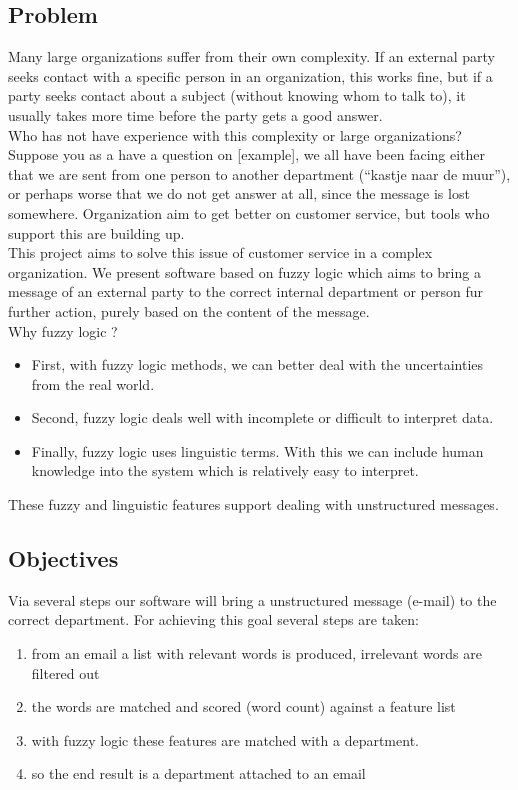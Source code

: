\documentclass[a4paper]{article}
\begin{document}
\subsection{Problem}
Many large organizations suffer from their own complexity. If an external party seeks contact with a specific person in an organization, this works fine, but if a party seeks contact about a subject (without knowing whom to talk to), it usually takes more time before the party gets a good answer. \\

Who has not have experience with this complexity or large organizations? Suppose you as a have a question on [example], we all have been facing either that we are sent from one person to another department (“kastje naar de muur”), or perhaps worse that we do not get answer at all, since the message is lost somewhere. Organization aim to get better on customer service, but tools who support this are building up. \\
 
This project aims to solve this issue of customer service in a complex organization. We present software based on fuzzy logic which aims to bring a message of an external party to the correct internal department or person fur further action, purely based on the content of the message. \\

Why fuzzy logic ? 
\begin{itemize}
    \item First, with fuzzy logic methods, we can better deal with the uncertainties from the real world.
    \item Second, fuzzy logic deals well with incomplete or difficult to interpret data. \item Finally, fuzzy logic uses linguistic terms. With this we can include human knowledge into the system which is relatively easy to interpret. 
\end{itemize}
These fuzzy and linguistic features support dealing with unstructured messages. 

\subsection{Objectives}

Via several steps our software will bring a unstructured message (e-mail) to the correct department. For achieving this goal several steps are taken: 
\begin{enumerate}
    \item from an email a list with relevant words is produced, irrelevant words are filtered out
    \item the words are matched and scored (word count) against a feature list
    \item with fuzzy logic these features are matched with a department. 
    \item so the end result is a department attached to an email
\end{enumerate}
\end{document}
